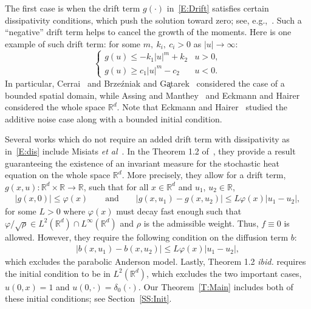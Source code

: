 \documentclass[a4paper,11pt]{article}%
\theoremstyle{plain}
\theoremstyle{definition}
\numberwithin{equation}{section}
\newcommand{\R}{\mathbb{R}}
\begin{document}
The first case is when the drift term $g(\cdot)$ in~\eqref{E:Drift} satisfies certain dissipativity
conditions, which push the solution toward zero; see, e.g.,~\cite{assing.manthey:03:invariant,
brzezniak.gatarek:99:martingale, cerrai:01:second, cerrai:03:stochastic,
eckmann.hairer:01:invariant}. Such a ``negative'' drift term helps to cancel the growth of the
moments. Here is one example of such drift term: for some $m,\: k_i, \: c_i>0$ as $|u| \to \infty$:
\begin{equation}\label{E:dis}
  \begin{cases}
    g(u) \le -k_1|u|^m + k_2 & u > 0, \\
    g(u) \ge c_1|u|^m - c_2  & u < 0.
  \end{cases}
\end{equation}
In particular, Cerrai~\cite{cerrai:01:second, cerrai:03:stochastic} and Brze\'{z}niak and
G\c{a}tarek~\cite{brzezniak.gatarek:99:martingale} considered the case of a bounded spatial domain,
while Assing and Manthey~\cite{assing.manthey:03:invariant} and Eckmann and
Hairer~\cite{eckmann.hairer:01:invariant} considered the whole space $\R^d$. Note that Eckmann and
Hairer~\cite{eckmann.hairer:01:invariant} studied the additive noise case along with a bounded
initial condition.

Several works which do not require an added drift term with dissipativity as in~\eqref{E:dis}
include Misiats \textit{et
al}~\cite{misiats.stanzhytskyi.ea:16:existence,misiats.stanzhytskyi.ea:20:invariant}. In the Theorem
1.2 of~\cite{misiats.stanzhytskyi.ea:20:invariant}, they provide a result guaranteeing the existence
of an invariant measure for the stochastic heat equation on the whole space $\R^d$. More precisely,
they allow for a drift term, $g(x,u):\R^d \times \R \to \R$, such that for all $x \in \R^d$ and
$u_1$, $u_2 \in \R$,
\begin{align*}
		|g(x,0)| \le \varphi(x) \qquad \text{and} \qquad |g(x,u_1) - g(x,u_2)| \le L\varphi(x)|u_1 - u_2|,
\end{align*}
for some $L>0$ where $\varphi(x)$ must decay fast enough such that $\varphi / \sqrt{\rho} \in
L^2 (\R^d) \cap L^{\infty}(\R^d)$ and $\rho$ is the admissible weight. Thus, $f \equiv 0$ is allowed.
However, they require the following condition on the diffusion term $b$:
\begin{align*}
  |b(x,u_1) - b(x,u_2)| \le L\varphi(x)|u_1 - u_2|,
\end{align*}
which excludes the parabolic Anderson model. Lastly, Theorem 1.2 \textit{ibid.} requires the initial
condition to be in $L^2 (\R^d)$, which excludes the two important cases, $u(0,x) = 1$ and
$u(0,\cdot) = \delta_0(\cdot)$. Our Theorem~\ref{T:Main} includes both of these initial conditions;
see Section~\ref{SS:Init}.
\end{document}
